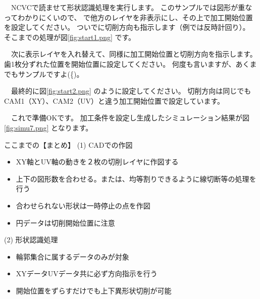 
　NCVCで読ませて形状認識処理を実行します。
このサンプルでは図形が重なってわかりにくいので、 で他方のレイヤを非表示にし、その上で加工開始位置を設定してください。
ついでに切削方向も指示します（例では反時計回り）。
そこまでの処理が図\ref{fig:start1.png} です。


　次に表示レイヤを入れ替えて、同様に加工開始位置と切削方向を指示します。
歯1枚分ずれた位置を開始位置に設定してください。
何度も言いますが、あくまでもサンプルですよ(^^;)。

　最終的に図\ref{fig:start2.png} のように設定してください。
切削方向は同じでもCAM1（XY）、CAM2（UV）と違う加工開始位置で設定しています。


　これで準備OKです。
加工条件を設定し生成したシミュレーション結果が図\ref{fig:simu7.png} となります。


\vspace*{3zh}
\begin{itembox}[l]{ここまでの【まとめ】}
(1) CADでの作図
\begin{itemize}
\item XY軸とUV軸の動きを２枚の切削レイヤに作図する
\item 上下の図形数を合わせる。または、均等割りできるように線切断等の処理を行う
\item 合わせられない形状は一時停止の点を作図
\item 円データは切削開始位置に注意
\end{itemize}
(2) 形状認識処理
\begin{itemize}
\item 輪郭集合に属するデータのみが対象
\item XYデータUVデータ共に必ず方向指示を行う
\item 開始位置をずらすだけでも上下異形状切削が可能
\end{itemize}
\end{itembox}
